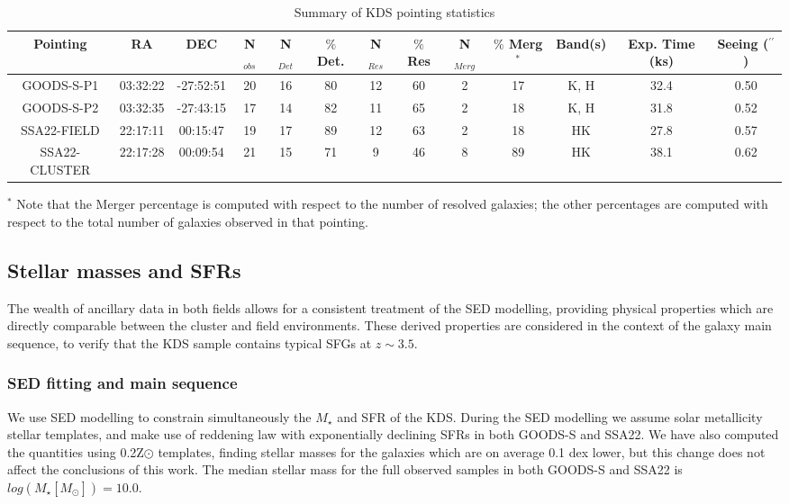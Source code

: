 \documentclass[fleqn,usenatbib]{mn2e}
\begin{document}
\begin{table*}
\centering
\begin{threeparttable}
\caption{Summary of KDS pointing statistics}
\label{tab:pointings}
\begin{tabular}{c c c c c c c c c c c c c}

 \hline
Pointing & RA & DEC & N$_{obs}$ & N$_{Det}$ & $\%$ Det. & N$_{Res}$ & $\%$ Res & N$_{Merg}$ & $\%$ Merg$^{*}$ & Band(s) & Exp. Time (ks) & Seeing ($^{\prime\prime}$)  \\
 \hline
 GOODS-S-P1 & 03:32:22 & -27:52:51 & 20 & 16 & 80 & 12 & 60 & 2 & 17 & K, H & 32.4 & 0.50 \\
GOODS-S-P2 & 03:32:35 & -27:43:15 & 17 & 14 & 82 & 11 & 65 & 2 & 18 & K, H & 31.8 & 0.52 \\
SSA22-FIELD & 22:17:11 & 00:15:47 & 19 & 17 & 89 & 12 & 63 & 2 & 18 & HK & 27.8 & 0.57 \\
SSA22-CLUSTER & 22:17:28 & 00:09:54 & 21 & 15 & 71 & 9 & 46 & 8 & 89 & HK & 38.1 & 0.62 \\
 \hline
\end{tabular}
\begin{tablenotes}
      \small
      \item $^{*}$ Note that the Merger percentage is computed with respect to the number of resolved galaxies; the other percentages are computed with respect to the total number of galaxies observed in that pointing.
    \end{tablenotes}
  \end{threeparttable}
  \end{table*}

\subsection{Stellar masses and SFRs}\label{subsec:stellar_masses_and_sfrs}
The wealth of ancillary data in both fields allows for a consistent treatment of the SED modelling, providing physical properties which are directly comparable between the cluster and field environments.
These derived properties are considered in the context of the galaxy main sequence, to verify that the KDS sample contains typical SFGs at $z\sim3.5$.   

\subsubsection{SED fitting and main sequence}\label{subsubsec:sed_fitting}
We use SED modelling to constrain simultaneously the $M_{\star}$ and SFR of the KDS.
During the SED modelling we assume solar metallicity stellar templates, and make use of \cite{Calzetti2000} reddening law with exponentially declining SFRs in both GOODS-S and SSA22.
We have also computed the quantities using 0.2Z$\odot$ templates, finding stellar masses for the galaxies which are on average 0.1 dex lower, but this change does not affect the conclusions of this work.
The median stellar mass for the full observed samples in both GOODS-S and SSA22 is $log(M_{\star}[M_{\odot}]) = 10.0$.
\end{document}
